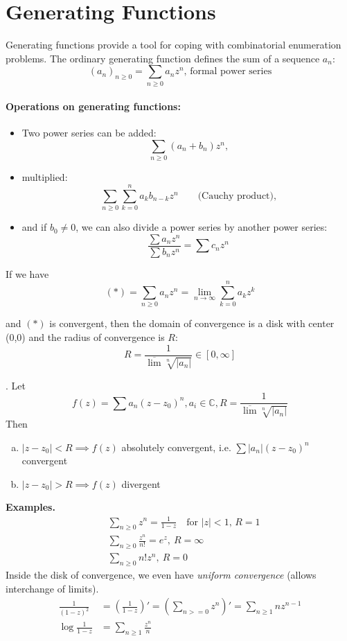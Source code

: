 
\section{Generating Functions}

Generating functions provide a tool for coping with combinatorial enumeration problems. The ordinary generating function defines the sum of a sequence $a_n$:
\[
	(a_n)_{n≥0} = \sum_{n≥0} a_n z^n \text{, formal power series}
\]
\paragraph{Operations on generating functions:}
\begin{itemize}
	\item Two power series can be added:
	\[
		\sum_{n≥0} (a_n + b_n) z^n \text{,}
	\]

	\item multiplied:
	\[
		\sum_{n≥0}\sum_{k=0}^n a_k b_{n-k} z^n \qquad \text{(Cauchy product),}
	\]

	\item and if $b_0 ≠ 0$, we can also divide a power series by another power series:
	\[
	    \frac{
	        \sum a_n z^n
	    }{
	        \sum b_n z^n
	    } =
	        \sum c_n z^n
	\]
\end{itemize}

If we have
\[
    (*) = \sum_{n≥0} a_n z^n = \lim_{n \to ∞} \sum_{k=0}^{n} a_k z^k
\]

and $(*)$ is convergent, then the domain of convergence is a disk with center (0,0) and the radius of convergence is $R$:
\[
    R = \frac1{\overline{\lim} \sqrt[n]{|a_n|}} \in [0, \infty]
\]

\Theorem.
Let
\[
    f(z) = \sum a_n (z-z_0)^n,
    a_i\in \mathbb{C},
    R = \frac{1}{\overline{\lim} \sqrt[n]{|a_n|}}
\]
Then
\begin{enumerate}[a)]
	\item $|z - z_0| < R \implies f(z)$ absolutely convergent, i.e.
	      $\sum |a_n| (z-z_0)^n$ convergent

	\item $|z - z_0| > R \implies f(z)$ divergent
\end{enumerate}

\textbf{Examples.}
\begin{align*}
    &\sum_{n≥0} z^n =
        \frac1{1-z}\quad\text{for $|z|<1$, } R = 1 \\
    &\sum_{n≥0} \frac{z^n}{n!} =
        e^z, ~R = ∞ \\
    &\sum_{n≥0} n! z^n, ~R = 0
\end{align*}
Inside the disk of convergence, we even have \emph{uniform convergence} (allows interchange of limits).
\begin{align*}
    \frac1{(1-z)^2}
    &= \left(\frac1{1-z}\right)'
    = \left(\sum_{n>=0} z^n\right)'
    = \sum_{n≥1} n z^{n-1} \\
    \log\frac{1}{1-z} &= \sum_{n≥1} \frac{z^n}{n}
\end{align*}


